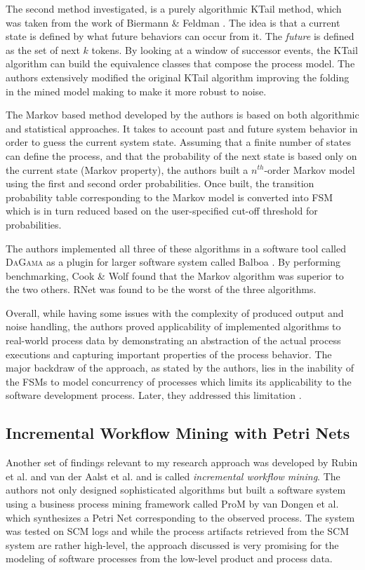 The second method investigated, is a purely algorithmic KTail method, which was taken from the work of 
Biermann \& Feldman \cite{citeulike:5120603}. The idea is that a current state is defined by what future behaviors can occur 
from it. The \textit{future} is defined as the set of next $k$ tokens. By looking at a window of successor events, the KTail 
algorithm can build the equivalence classes that compose the process model. The authors extensively modified the original 
KTail algorithm improving the folding in the mined model making to make it more robust to noise.

The Markov based method developed by the authors is based on both algorithmic and statistical approaches. 
It takes to account past and future system behavior in order to guess the current system state. Assuming that a finite number 
of states can define the process, and that the probability of the next state is based only on the current state (Markov property), 
the authors built a $n^{th}$-order Markov model using the first and second order probabilities. Once built, the transition 
probability table corresponding to the Markov model is converted into FSM which is in turn reduced based on the user-specified 
cut-off threshold for probabilities.

The authors implemented all three of these algorithms in a software tool called \textsc{DaGama} as a plugin for larger software
system called Balboa \cite{citeulike:5120757}. By performing benchmarking, Cook \& Wolf found that the Markov algorithm was 
superior to the two others. RNet was found to be the worst of the three algorithms. 

Overall, while having some issues with the complexity of produced output and noise handling, the authors proved applicability 
of implemented algorithms to real-world process data by demonstrating an abstraction of the actual process executions and 
capturing important properties of the process behavior. The major backdraw of the approach, as stated by the authors, 
lies in the inability of the FSMs to model concurrency of processes which limits its applicability to the software development process.
Later, they addressed this limitation \cite{citeulike:5128143}.


\subsection{Incremental Workflow Mining with Petri Nets}
Another set of findings relevant to my research approach was developed by Rubin
et al. \cite{citeulike:1885717} and van der Aalst et al.
\cite{citeulike:3718014} and is called \textit{incremental workflow mining}. The
authors not only designed sophisticated algorithms but built a software system
using a business process mining framework called ProM by van Dongen et al.
\cite{citeulike:5043673} which synthesizes a Petri Net corresponding to the
observed process. The system was tested on SCM logs and while the process
artifacts retrieved from the SCM system are rather high-level, the approach
discussed is very promising for the modeling of software processes from the
low-level product and process data.


